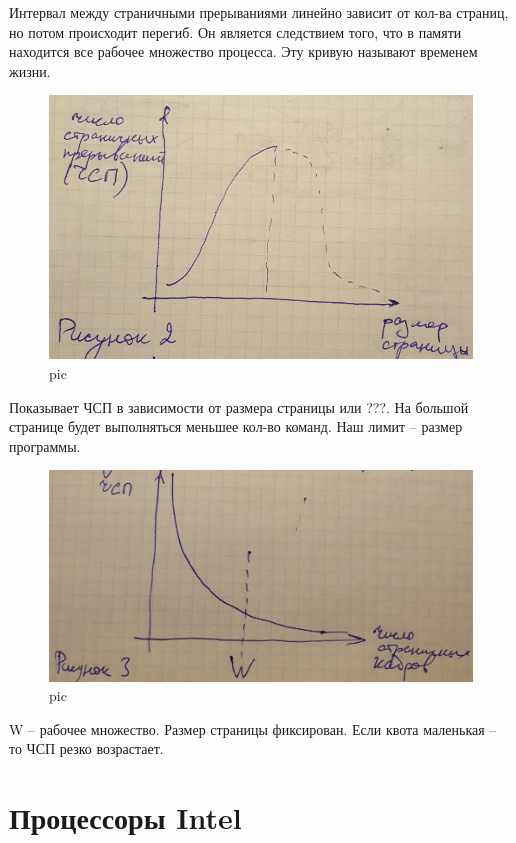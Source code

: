 Интервал между страничными прерываниями линейно зависит от кол-ва страниц, но потом происходит перегиб. Он является следствием того, что в памяти находится все рабочее множество процесса. Эту кривую называют временем жизни.

\begin{figure}[H]
    \centering
    \includegraphics[width=\textwidth]{pic/2.png}
    \caption{pic}
\end{figure}

Показывает ЧСП в зависимости от размера страницы или ???. На большой странице будет выполняться меньшее кол-во команд. Наш лимит – размер программы. 

\begin{figure}[H]
    \centering
    \includegraphics[width=\textwidth]{pic/3.png}
    \caption{pic}
\end{figure}

W – рабочее множество. Размер страницы фиксирован. Если квота маленькая – то ЧСП резко возрастает. 

\section{Процессоры Intel}

